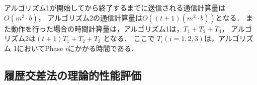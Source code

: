 \documentclass[a4paper,12pt]{jsarticle}
\begin{document}




アルゴリズム1が開始してから終了するまでに送信される通信計算量は$O(m^2 \cdot b)$，
アルゴリズム2の通信計算量は$O((t+1)(m^2 \cdot b))$となる．
また動作を行った場合の時間計算量は，アルゴリズム1は，$ T_1 + T_2 + T_3 $，
アルゴリズム2は$ ( t + 1 ) T_1 + T_2 + T_3 $ となる．
ここで $T_i (i=1, 2, 3)$は，アルゴリズム 1においてPhase $i$にかかる時間である．


\subsection{履歴交差法の理論的性能評価}
\end{document}
